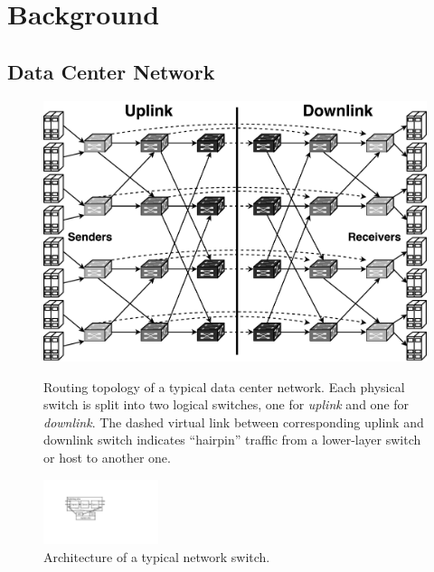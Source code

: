 \section{Background}
\label{sec:background}

\subsection{Data Center Network}
\label{sec:dcn}




\begin{figure}[t]
\centering
{\includegraphics[width=.48\textwidth]{images/dcn_dag.pdf}}
\caption{
	Routing topology of a typical data center network.
	Each physical switch is split into two logical switches, one for \textit{uplink} and one for \textit{downlink}.
    The dashed virtual link between corresponding uplink and downlink switch indicates ``hairpin'' traffic from a lower-layer switch or host to another one.
}
\label{fig:dcn}
\vspace{-1.5em}
\end{figure}

\begin{figure}[t]
\centering
\includegraphics[width=0.3\textwidth]{images/cropped_switch_architecture.pdf}
\caption{Architecture of a typical network switch.}
\label{fig:switch}
\vspace{-1.5em}
\end{figure}

